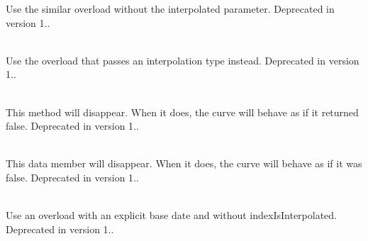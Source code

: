 \begin{DoxyRefList}
\label{deprecated__deprecated000100}%
%
Use the similar overload without the interpolated parameter. Deprecated in version 1..  
\item[Member \doxylink{class_quant_lib_1_1yoy_inflation_leg_a2fbc15494fbbf55aae84a7a54af27553}{Quant\+Lib\+::yoy\+Inflation\+Leg\+::yoy\+Inflation\+Leg} (\doxylink{class_quant_lib_1_1_schedule}{Schedule} schedule, \doxylink{class_quant_lib_1_1_calendar}{Calendar} cal, ext\+::shared\+\_\+ptr$<$ Yo\+YInflation\+Index $>$ index, const \doxylink{class_quant_lib_1_1_period}{Period} \&observation\+Lag)]\hfill \\
\label{deprecated__deprecated000010}%
%
Use the overload that passes an interpolation type instead. Deprecated in version 1..  
\item[Member \doxylink{class_quant_lib_1_1_yo_y_inflation_term_structure_a5a91177ad922d2daf5017bd6b38e4681}{Quant\+Lib\+::Yo\+YInflation\+Term\+Structure\+::index\+Is\+Interpolated} () const]\hfill \\
\label{deprecated__deprecated000146}%
%
This method will disappear. When it does, the curve will behave as if it returned false. Deprecated in version 1..  
\item[Member \doxylink{class_quant_lib_1_1_yo_y_inflation_term_structure_ae4f21251e423b660f21edabad6ffefd0}{Quant\+Lib\+::Yo\+YInflation\+Term\+Structure\+::index\+Is\+Interpolated\+\_\+} ]\hfill \\
\label{deprecated__deprecated000147}%
%
This data member will disappear. When it does, the curve will behave as if it was false. Deprecated in version 1..  
\item[Member \doxylink{class_quant_lib_1_1_yo_y_inflation_term_structure_aa67821d1c91ccdd21eea7fe92bcc1112}{Quant\+Lib\+::Yo\+YInflation\+Term\+Structure\+::Yo\+YInflation\+Term\+Structure} (\doxylink{class_quant_lib_1_1_date}{Date} base\+Date, \doxylink{namespace_quant_lib_a919ba3567cc89fca373f8d6b8e80126b}{Rate} base\+Yo\+YRate, \doxylink{namespace_quant_lib_abfa020992bcf412e2bc99f56d4381b4a}{Frequency} frequency, bool index\+Is\+Interpolated, const \doxylink{class_quant_lib_1_1_day_counter}{Day\+Counter} \&day\+Counter, const ext\+::shared\+\_\+ptr$<$ Seasonality $>$ \&seasonality=\{\})]\hfill \\
\label{deprecated__deprecated000140}%
%
Use an overload with an explicit base date and without index\+Is\+Interpolated. Deprecated in version 1..  

\end{DoxyRefList}
